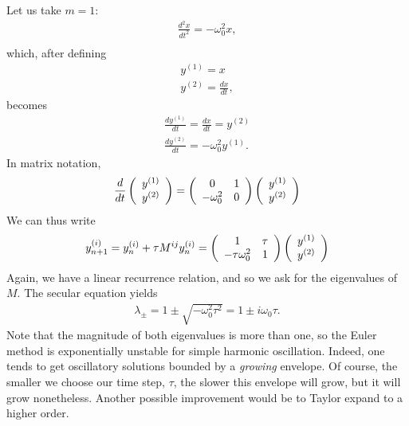 \documentclass{mathnotes}
\begin{document}
\begin{exmp}
    Let us take $m=1$:
    \begin{align*}
        \frac{d^2x}{dt^2}=-\omega_0^2 x,\\
    \end{align*}
    which, after defining
    \begin{align*}
        y^{(1)}=x\\
        y^{(2)}=\frac{dx}{dt},
    \end{align*}
    becomes
    \begin{align*}
        \frac{dy^{(1)}}{dt}=\frac{dx}{dt}=y^{(2)}\\
        \frac{dy^{(2)}}{dt}=-\omega_0^2 y^{(1)}.
    \end{align*}
    In matrix notation,
    \begin{align*}
        \frac{d}{dt}
        \left(
        \begin{array}[]{c}
            y^{(1)}\\
            y^{(2)}
        \end{array}
        \right)=
        \left( 
        \begin{array}[]{cc}
            0 & 1\\
            -\omega_0^2 & 0
        \end{array}
        \right)
        \left( 
        \begin{array}[]{c}
            y^{(1)}\\
            y^{(2)}
        \end{array}
        \right)
    \end{align*}
    We can thus write
    \begin{align*}
        y^{(i)}_{n+1}=y_n^{(i)}+\tau M^{ij}y_n^{(i)}=
        \left( 
        \begin{array}[]{cc}
            1 & \tau\\
            -\tau\omega_0^2 & 1
        \end{array}
        \right)
        \left( 
        \begin{array}[]{c}
            y^{(1)}\\
            y^{(2)}
        \end{array}
        \right)
    \end{align*}
    Again, we have a linear recurrence relation, and so we ask for the eigenvalues of $M$. The secular equation yields
    \begin{align*}
        \lambda_{\pm}=1\pm\sqrt{-\omega_0^2\tau^2}=1\pm i\omega_0\tau.
    \end{align*}
Note that the magnitude of both eigenvalues is more than one, so the Euler method is exponentially unstable for simple harmonic oscillation.
Indeed, one tends to get oscillatory solutions bounded by a \textit{growing} envelope. Of course, the smaller we choose our time step, $\tau$,
the slower this envelope will grow, but it will grow nonetheless. Another possible improvement would be to Taylor expand to a higher order.
\end{exmp}
\end{document}
